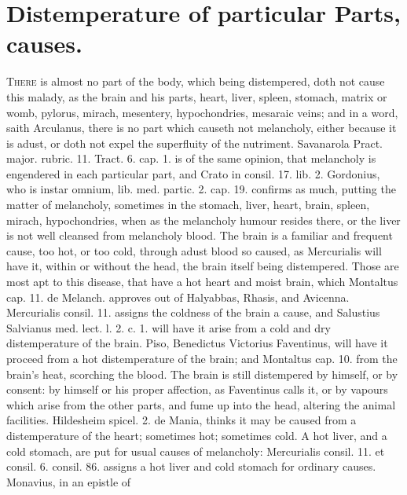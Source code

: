 {%
\section{Distemperature of particular Parts, causes.}

\lettrine{T}{here} is almost no part of the body, which being distempered, doth not
cause this malady, as the brain and his parts, heart, liver, spleen,
stomach, matrix or womb, pylorus, mirach, mesentery, hypochondries,
mesaraic veins; and in a word, saith Arculanus, there is no part
which causeth not melancholy, either because it is adust, or doth not
expel the superfluity of the nutriment. Savanarola Pract. major.
rubric. 11. Tract. 6. cap. 1. is of the same opinion, that melancholy
is engendered in each particular part, and Crato in consil. 17.
lib. 2. Gordonius, who is instar omnium, lib. med. partic. 2. cap. 19.
confirms as much, putting the matter of melancholy, sometimes in
the stomach, liver, heart, brain, spleen, mirach, hypochondries, when
as the melancholy humour resides there, or the liver is not well
cleansed from melancholy blood.
The brain is a familiar and frequent cause, too hot, or too cold,
 through adust blood so caused, as Mercurialis will have it,
within or without the head, the brain itself being distempered. Those
are most apt to this disease, that have a hot heart and moist
brain, which Montaltus cap. 11. de Melanch. approves out of Halyabbas,
Rhasis, and Avicenna. Mercurialis consil. 11. assigns the coldness of
the brain a cause, and Salustius Salvianus med. lect. l. 2. c. 1.
will have it arise from a cold and dry distemperature of the
brain. Piso, Benedictus Victorius Faventinus, will have it proceed from
a hot distemperature of the brain; and Montaltus cap. 10.
from the brain's heat, scorching the blood. The brain is still
distempered by himself, or by consent: by himself or his proper
affection, as Faventinus calls it, or by vapours which arise from
the other parts, and fume up into the head, altering the animal
facilities.
Hildesheim spicel. 2. de Mania, thinks it may be caused from a 
distemperature of the heart; sometimes hot; sometimes cold. A hot
liver, and a cold stomach, are put for usual causes of melancholy:
Mercurialis consil. 11. et consil. 6. consil. 86. assigns a hot liver
and cold stomach for ordinary causes. Monavius, in an epistle of
}
